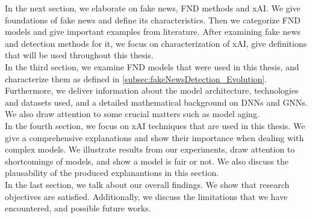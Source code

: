 In the next section, we elaborate on fake news, FND methods and xAI. We give foundations of fake news and define its characteristics. Then we categorize FND models and give important examples from literature. After examining fake news and detection methods for it, we focus on characterization of xAI, give definitions that will be used throughout this thesis.\\
In the third section, we examine FND models that were used in this thesis, and characterize them as defined in \ref{subsec:fakeNewsDetection_Evolution}. Furthermore, we deliver information about the model architecture, technologies and datasets used, and a detailed mathematical background on DNNs and GNNs. We also draw attention to some crucial matters such as model aging.\\
In the fourth section, we focus on xAI techniques that are used in this thesis. We give a comprehensive explanations and show their importance when dealing with complex models. We illustrate results from our experiments, draw attention to shortcomings of models, and show a model is fair or not. We also discuss the plausability of the produced explanantions in this section.\\
In the last section, we talk about our overall findings. We show that research objectives are satisfied. Additionally, we discuss the limitations that we have encountered, and possible future works.






